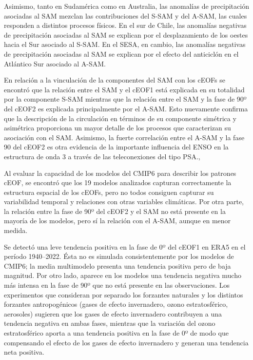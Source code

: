 \documentclass[12pt,oneside,a4paper]{reedthesis}
\begin{document}
Asimismo, tanto en Sudamérica como en Australia, las anomalías de precipitación asociadas al SAM mezclan las contribuciones del S-SAM y del A-SAM, las cuales responden a distintos procesos físicos.
En el sur de Chile, las anomalías negativas de precipitación asociadas al SAM se explican por el desplazamiento de los oestes hacia el Sur asociado al S-SAM.
En el SESA, en cambio, las anomalías negativas de precipitación asociadas al SAM se explican por el efecto del anticiclón en el Atlántico Sur asociado al A-SAM.~

En relación a la vinculación de la componentes del SAM con los cEOFs se encontró que la relación entre el SAM y el cEOF1 está explicada en su totalidad por la componente S-SAM mientras que la relación entre el SAM y la fase de 90º del cEOF2 es explicada principalmente por el A-SAM.
Esto nuevamente confirma que la descripción de la circulación en términos de su componente simétrica y asimétrica proporciona un mayor detalle de los procesos que caracterizan su asociación con el SAM.
Asimismo, la fuerte correlación entre el A-SAM y la fase 90 del cEOF2 es otra evidencia de la importante influencia del ENSO en la estructura de onda 3 a través de las teleconexiones del tipo PSA.,

Al evaluar la capacidad de los modelos del CMIP6 para describir los patrones cEOF, se encontró que los 19 modelos analizados capturan correctamente la estructura espacial de los cEOFs, pero no todos consiguen capturar su variabilidad temporal y relaciones con otras variables climáticas.
Por otra parte, la relación entre la fase de 90º del cEOF2 y el SAM no está presente en la mayoría de los modelos, pero sí la relación con el A-SAM, aunque en menor medida.

Se detectó una leve tendencia positiva en la fase de 0º del cEOF1 en ERA5 en el período 1940--2022.
Ésta no es simulada consistentemente por los modelos de CMIP6; la media multimodelo presenta una tendencia positiva pero de baja magnitud.
Por otro lado, aparece en los modelos una tendencia negativa mucho más intensa en la fase de 90º que no está presente en las observaciones.
Los experimentos que consideran por separado los forzantes naturales y los distintos forzantes antropogénicos (gases de efecto invernadero, ozono estratosférico, aerosoles) sugieren que los gases de efecto invernadero contribuyen a una tendencia negativa en ambas fases, mientras que la variación del ozono estratosférico aporta a una tendencia positiva en la fase de 0º de modo que compensando el efecto de los gases de efecto invernadero y generan una tendencia neta positiva.
\end{document}
